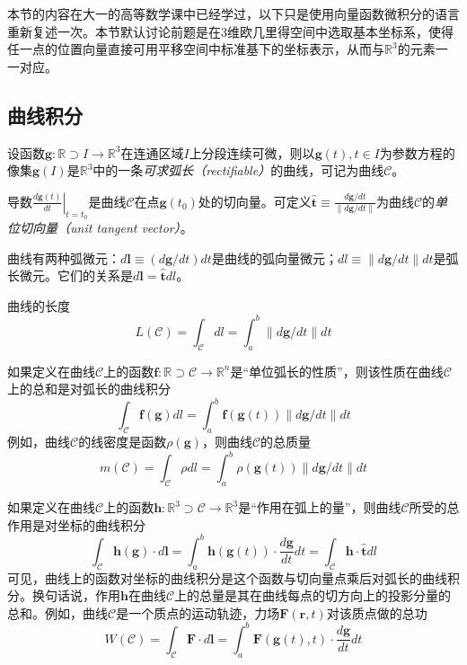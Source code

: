 \documentclass[main.tex]{subfiles}
\begin{document}
本节的内容在大一的高等数学课中已经学过\cite[\S 9]{华工高数2009下}，以下只是使用向量函数微积分的语言重新复述一次。本节默认讨论前题是在3维欧几里得空间中选取基本坐标系，使得任一点的位置向量直接可用平移空间中标准基下的坐标表示，从而与$\mathbb{R}^3$的元素一一对应。

\subsection{曲线积分}
设函数$\mathbf{g}:\mathbb{R}\supset I\rightarrow\mathbb{R}^3$在连通区域$I$上分段连续可微，则以$\mathbf{g}\left(t\right),t\in I$为参数方程的像集$\mathbf{g}\left(I\right)$是$\mathbb{R}^3$中的一条\emph{可求弧长（rectifiable）}的曲线，可记为曲线$\mathcal{C}$。

导数$\left.\frac{d\mathbf{g}\left(t\right)}{dt}\right|_{t=t_0}$是曲线$\mathcal{C}$在点$\mathbf{g}\left(t_0\right)$处的切向量。可定义$\mathbf{\hat{t}}\equiv\frac{d\mathbf{g}/dt}{\left\|d\mathbf{g}/dt\right\|}$为曲线$\mathcal{C}$的\emph{单位切向量（unit tangent vector）}。

曲线有两种弧微元：$d\mathbf{l}\equiv\left(d\mathbf{g}/dt\right)dt$是曲线的弧向量微元；$dl\equiv\left\|d\mathbf{g}/dt\right\|dt$是弧长微元。它们的关系是$d\mathbf{l}=\mathbf{\hat{t}}dl$。

曲线的长度
\[L\left(\mathcal{C}\right)=\int_\mathcal{C}dl=\int_a^b\left\|d\mathbf{g}/dt\right\|dt
\]

如果定义在曲线$\mathcal{C}$上的函数$\mathbf{f}:\mathbb{R}\supset\mathcal{C}\rightarrow\mathbb{R}^n$是“单位弧长的性质”，则该性质在曲线$\mathcal{C}$上的总和是对弧长的曲线积分\cite[\S 9.1,定理9.1.1]{华工高数2009下}
\[
    \int_\mathcal{C}\mathbf{f}\left(\mathbf{g}\right)dl=\int_{a}^{b}\mathbf{f}\left(\mathbf{g}\left(t\right)\right)\left\|d\mathbf{g}/dt\right\|dt
\]
例如，曲线$\mathcal{C}$的线密度是函数$\rho\left(\mathbf{g}\right)$，则曲线$\mathcal{C}$的总质量
\[
    m\left(\mathcal{C}\right)=\int_\mathcal{C}\rho dl=\int_a^b\rho\left(\mathbf{g}\left(t\right)\right)\left\|d\mathbf{g}/dt\right\|dt
\]

如果定义在曲线$\mathcal{C}$上的函数$\mathbf{h}:\mathbb{R}^3\supset\mathcal{C}\rightarrow\mathbb{R}^3$是“作用在弧上的量”，则曲线$\mathcal{C}$所受的总作用是对坐标的曲线积分\cite[p.~140,定理9.2.1]{华工高数2009下}
\[
    \int_\mathcal{C}\mathbf{h}\left(\mathbf{g}\right)\cdot d\mathbf{l}=\int_a^b\mathbf{h}\left(\mathbf{g}\left(t\right)\right)\cdot\frac{d\mathbf{g}}{dt}dt=\int_\mathcal{C}\mathbf{h}\cdot\mathbf{\hat{t}}dl
\]
可见，曲线上的函数对坐标的曲线积分是这个函数与切向量点乘后对弧长的曲线积分。换句话说，作用$\mathbf{h}$在曲线$\mathcal{C}$上的总量是其在曲线每点的切方向上的投影分量的总和。例如，曲线$\mathcal{C}$是一个质点的运动轨迹，力场$\mathbf{F}\left(\mathbf{r},t\right)$对该质点做的总功
\[W\left(\mathcal{C}\right)=\int_\mathcal{C}\mathbf{F}\cdot d\mathbf{l}=\int_a^b\mathbf{F}\left(\mathbf{g}\left(t\right),t\right)\cdot \frac{d\mathbf{g}}{dt}dt
\]
\end{document}
